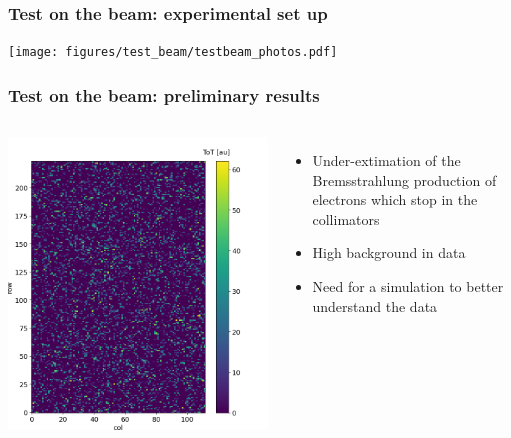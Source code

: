     \begin{frame}
        \frametitle{Test on the beam: experimental set up}
        \centering
        \texttt{[image: figures/test\_beam/testbeam\_photos.pdf]}  
    \end{frame}    

    \begin{frame}
        \frametitle{Test on the beam: preliminary results}
        \begin{columns}
                \includegraphics[width=1.1\linewidth]{figures/test_beam/tot_mapq1_15-57.png}  
                \begin{itemize}
                    \item Under-extimation of the Bremsstrahlung production of electrons which stop in the collimators 
                    \item High background in data
                    \item Need for a simulation to better understand the data
                \end{itemize}
            \end{columns}
        \end{frame}  


